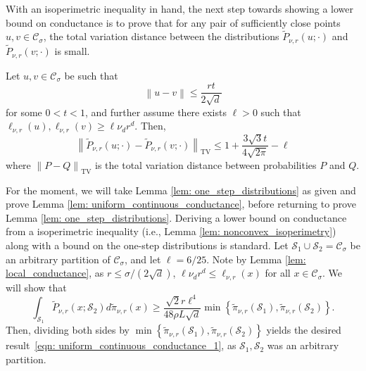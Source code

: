 \documentclass[11pt,twoside]{article}
\newcommand{\set}[1]{\left\{#1\right\}}
\newcommand{\norm}[1]{\left\lVert#1\right\rVert}
\newcommand{\1}{\mathbbm{1}}
\newcommand{\Sset}{\mathcal{S}}
\newcommand{\Cset}{\mathcal{C}}
\newcommand{\Csig}{\Cset_{\sigma}}
\begin{document}
With an isoperimetric inequality in hand, the next step towards showing a lower bound on conductance is to prove that for any pair of sufficiently close points $u,v \in \Csig$, the total variation distance between the distributions $\widetilde{P}_{\nu,r}(u;\cdot)$ and $\widetilde{P}_{\nu,r}(v;\cdot)$ is small. 
\begin{lemma}
	\label{lem: one_step_distributions}
	Let $u,v \in \Csig$ be such that 
	\begin{equation*}
	\norm{u - v} \leq \frac{r t}{2\sqrt{d}}
	\end{equation*}
	for some $0 < t < 1$, and further assume there exists $\ell > 0$ such that $\ell_{\nu,r}(u), \ell_{\nu,r}(v) \geq \ell \nu_d r^d$. Then,
	\begin{equation*}
	\norm{\widetilde{P}_{\nu,r}(u; \cdot) - \widetilde{P}_{\nu,r}(v; \cdot)}_{\mathrm{TV}} \leq 1 + \frac{3 \sqrt{3} t}{4\sqrt{2\pi}} - \ell
	\end{equation*}
	where $\norm{P - Q}_{\mathrm{TV}}$ is the total variation distance between probabilities $P$ and $Q$. 
\end{lemma}
For the moment, we will take Lemma \ref{lem: one_step_distributions} as given and prove Lemma \ref{lem: uniform_continuous_conductance}, before returning to prove Lemma \ref{lem: one_step_distributions}. Deriving a lower bound on conductance from a isoperimetric inequality (i.e., Lemma \ref{lem: nonconvex_isoperimetry}) along with a bound on the one-step distributions is standard. Let $\Sset_1 \cup \Sset_2 = \Csig$ be an arbitrary partition of $\Csig$, and let $\ell = 6/25$. Note by Lemma \ref{lem: local_conductance}, as $r \leq \sigma/(2\sqrt{d})$, $\ell \nu_d r^d  \leq \ell_{\nu,r}(x)$ for all $x \in \Csig$. We will show that 
\begin{equation}
\label{eqn: uniform_continuous_conductance_1}
\int_{\Sset_1} \widetilde{P}_{\nu,r}(x; \Sset_2) d \widetilde{\pi}_{\nu,r}(x) \geq \frac{\sqrt{2} r \ell^4}{48 \rho L \sqrt{d}} \min\set{\widetilde{\pi}_{\nu,r}(\Sset_1), \widetilde{\pi}_{\nu,r}(\Sset_2)}.
\end{equation}
Then, dividing both sides by $\min\set{\widetilde{\pi}_{\nu,r}(\Sset_1), \widetilde{\pi}_{\nu,r}(\Sset_2)}$ yields the desired result~\eqref{eqn: uniform_continuous_conductance_1}, as $\Sset_1,\Sset_2$ was an arbitrary partition.
\end{document}
